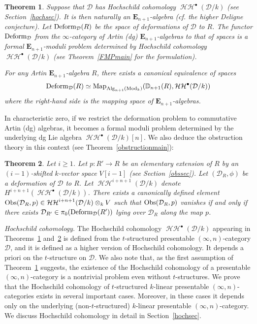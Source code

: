 \documentclass[leqno,12pt]{amsart}
\theoremstyle{plain}
\newtheorem{Theorem}{Theorem}[section]
\theoremstyle{definition}
\newcommand{\DD}{\mathbb{D}}
\newcommand{\HH}{\operatorname{\mathcal{HH}}}
\newcommand{\DDD}{\mathcal{D}}
\newcommand{\Mod}{\operatorname{Mod}}
\newcommand{\Map}{\operatorname{Map}}
\newcommand{\Alg}{\operatorname{Alg}}
\begin{document}
\begin{Theorem}
\label{intromain2}
Suppose that $\DDD$ has Hochschild cohomology $\HH^\bullet(\DDD/k)$ (see Section~\ref{hochsec}).
It is then naturally an $\mathbf{E}_{n+1}$-algebra (cf. the higher Deligne conjecture).
Let $\textup{Deform}_{\DDD}(R)$ be the space of deformations of $\DDD$ to $R$. 
The functor
$\textup{Deform}_{\DDD}$ from the $\infty$-category of Artin (dg) $\mathbf{E}_{n+1}$-algebras to that of spaces is a formal $\mathbf{E}_{n+1}$-moduli problem determined by
Hochschild cohomology $\HH^\bullet(\DDD/k)$ (see Theorem~\ref{FMPmain} for the formulation).

For any Artin $\mathbf{E}_{n+1}$-algebra $R$, there exists a canonical equivalence of spaces
\[
\textup{Deform}_{\DDD}(R)\simeq \Map_{\Alg_{n+1}(\Mod_k)}(\DD_{n+1}(R),\HH^\bullet(\DDD/k))
\]
where the right-hand side is the mapping space of $\mathbf{E}_{n+1}$-algebras.
\end{Theorem}


In characteristic zero, if we restrict the deformation problem to commutative Artin (dg) algebras, it becomes a formal moduli problem
determined by the underlying dg Lie algebra $\HH^\bullet(\DDD/k)[n]$.
We also deduce the obstruction theory in this context (see Theorem~\ref{obstructionmain}):



\begin{Theorem}
\label{intromain3}
Let $i\ge1$.
Let $p:R'\to R$ be an elementary extension of $R$ by an $(i-1)$-shifted $k$-vector space $V[i-1]$ (see Section~\ref{obssec}).
Let $(\DDD_R,\phi)$ be a deformation of $\DDD$ to $R$.
Let $\HH^{i+n+1}(\DDD/k)$ denote $H^{i+n+1}(\HH^\bullet(\DDD/k))$.
There exists a canonically defined element $\textup{Obs}(\DDD_R,p)\in \HH^{i+n+1}(\DDD/k)\otimes_kV$ 
such that $\textup{Obs}(\DDD_R,p)$ vanishes if and only if there exists $\DDD_{R'}\in \pi_0(\textup{Deform}_{\DDD}(R'))$ lying over $\DDD_R$ along  the map $p$.
\end{Theorem}



{\it Hochschild cohomology.}
The Hochschild cohomology $\HH^\bullet(\DDD/k)$ appearing in Theorems~\ref{intromain2} and~\ref{intromain3} is defined from the $t$-structured presentable
$(\infty,n)$-category $\DDD$, and it is defined as a higher version of Hochschild cohomology.  
It depends a priori on the $t$-structure on $\DDD$. We also note that, as the first assumption of Theorem~\ref{intromain2} suggests, the existence of the Hochschild cohomology of a presentable $(\infty,n)$-category is a nontrivial problem even without $t$-structures. We prove that the Hochschild cohomology of $t$-structured $k$-linear presentable $(\infty,n)$-categories exists in several important cases. Moreover, in these cases it depends only on the underlying (non-$t$-structured) $k$-linear presentable $(\infty,n)$-category.
We discuss Hochschild cohomology in detail in Section~\ref{hochsec}.
\end{document}
